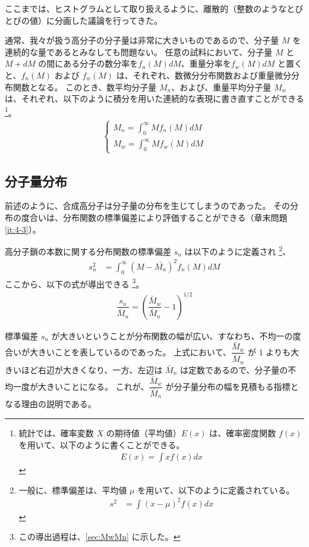 \documentclass[a4paper,11pt]{ltjsarticle}
\begin{document}
ここまでは、ヒストグラムとして取り扱えるように、離散的（整数のようなとびとびの値）に分画した議論を行ってきた。

通常、我々が扱う高分子の分子量は非常に大きいものであるので、分子量 $M$ を連続的な量であるとみなしても問題ない。
任意の試料において、分子量 $M$ と $M+dM$ の間にある分子の数分率を$f_n(M)dM$、重量分率を$f_w(M)dM$ と置くと、$f_n(M)$ および $f_w(M)$ は、それぞれ、数微分分布関数および重量微分分布関数となる。
このとき、数平均分子量 $M_n$、および、重量平均分子量 $M_w$ は、それぞれ、以下のように積分を用いた連続的な表現に書き直すことができる
\footnote
{
統計では、確率変数 $X$ の期待値（平均値）$E(x)$ は、確率密度関数 $f(x)$ を用いて、以下のように書くことができる。
\begin{align*}
E(x) = \displaystyle \int x f(x) dx
\end{align*}
}。
\begin{align}
\begin{cases}
M_n = \displaystyle\int_0^{\infty} M f_n (M)dM \\[10pt]
M_w = \displaystyle\int_0^{\infty} M f_w (M)dM
\end{cases}
\end{align}

\subsection{分子量分布}

前述のように、合成高分子は分子量の分布を生じてしまうのであった。
その分布の度合いは、分布関数の標準偏差により評価することができる（章末問題 \ref{it:4-3}）。

高分子鎖の本数に関する分布関数の標準偏差 $s_n$ は以下のように定義され
\footnote
{
一般に、標準偏差は、平均値 $\mu$ を用いて、以下のように定義されている。
\begin{align*}
s^2
	&= \displaystyle \int(x - \mu)^2 f(x) dx
\end{align*}
}、
\begin{align}
s_n^2
	&= \displaystyle \int_0^{\infty}(M - \bar{M_n})^2 f_n(M) dM
\end{align}
ここから、以下の式が導出できる
\footnote
{
この導出過程は、\ref{sec:MwMn} に示した。
}。
\begin{align}
\dfrac{s_n}{\bar{M}_n} = \left(\dfrac{\bar{M}_w}{\bar{M}_n}-1\right)^{1/2}
\end{align}

標準偏差 $s_n$ が大きいということが分布関数の幅が広い、すなわち、不均一の度合いが大きいことを表しているのであった。
上式において、$\dfrac{\bar{M}_w}{\bar{M}_n}$ が 1 よりも大きいほど右辺が大きくなり、一方、左辺は $\bar{M}_n$ は定数であるので、分子量の不均一度が大きいことになる。
これが、$\dfrac{\bar{M}_w}{\bar{M}_n}$ が分子量分布の幅を見積もる指標となる理由の説明である。
 
\end{document}
